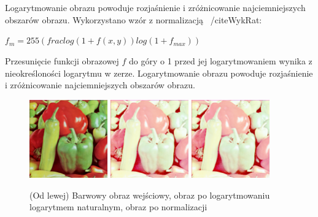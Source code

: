 \documentclass[final,a4paper,openany,12pt]{mwbk}
\begin{document}
\hfill
\\\\
\indent
Logarytmowanie obrazu powoduje rozjaśnienie i zróżnicowanie najciemniejszych obszarów obrazu.
Wykorzystano wzór z normalizacją ~/cite{WykRat}:
	
	\begin{center}
		$f_{m} = 255(frac{log(1 + f(x,y))}{log(1 + f_{max})})$
	\end{center}

	
Przesunięcie funkcji obrazowej $f$ do góry o 1 przed jej logarytmowaniem wynika z nieokreśloności logarytmu w zerze. Logarytmowanie obrazu powoduje rozjaśnienie i zróżnicowanie najciemniejszych obszarów obrazu.	

\begin{figure}[H]
	\begin{center}
		\includegraphics[width=0.3\textwidth]{1/1Color_Log_Original}
		\includegraphics[width=0.3\textwidth]{1/1Color_Log_Result}
		\includegraphics[width=0.3\textwidth]{1/1Color_Log_Result_Norm}
	\end{center}
	\caption{(Od lewej) Barwowy obraz wejściowy, obraz po logarytmowaniu logarytmem naturalnym, obraz po normalizacji }
\end{figure}
\end{document}
